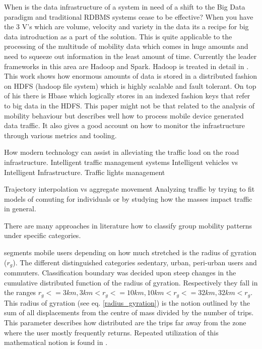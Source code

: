\documentclass[12pt, a4paper]{report}
\theoremstyle{definition}
\theoremstyle{definition}%
\theoremstyle{definition}%
\theoremstyle{definition}%
\theoremstyle{definition}%
\theoremstyle{definition}%
\begin{document}
When is the data infrastructure of a system in need of a shift to the Big Data paradigm and traditional RDBMS systems cease to be effective? When you have the 3 V's which are volume, velocity and variety in the data its a recipe for big data introduction as a part of the solution. This is quite applicable to the processing of the multitude of mobility data which comes in huge amounts and need to squeeze out information in the least amount of time. Currently the leader frameworks in this area are Hadoop and Spark. Hadoop is treated in detail in \cite{Liu2014}. This work shows how enormous amounts of data is stored in a distributed fashion on HDFS (hadoop file system) which is highly scalable and fault tolerant. On top of his there is Hbase which logically stores in an indexed fashion keys that refer to big data in the HDFS. This paper \cite{Liu2014} might not be that related to the analysis of mobility behaviour but describes well how to process mobile device generated data traffic. It also gives a good account on how to monitor the infrastructure through various metrics and tooling.   

How modern technology can assist in alleviating the traffic load on the road infrastructure.
Intelligent traffic management systems
Intelligent vehicles vs Intelligent Infrastructure. \cite{Nkoro2014}
Traffic lights management \cite{AlNuaimi2015} \cite{Marino2017}



Trajectory interpolation vs aggregate movement
Analyzing traffic by trying to fit models of comuting for individuals or by studying how the masses impact traffic in general.

There are many approaches in literature how to classify group mobility patterns under specific categories.

\cite{Hoteit2014} segments mobile users depending on how much stretched is the radius of gyration (\(r_{g}\)). The different distinguished categories sedentary, urban, peri-urban users and commuters. Classification boundary was decided upon steep changes in the cumulative distributed function of the radius of gyration. Respectively they fall in the ranges \(r_{g} <= 3km, 3km < r_{g} <= 10km, 10km < r_{g} <= 32km, 32km < r_{g}\). This radius of gyration (see eq. \ref{radius_gyration}) is the notion outlined by the sum of all displacements from the centre of mass divided by the number of trips. This parameter describes how distributed are the trips far away from the zone where the user mostly frequently returns. Repeated utilization of this mathematical notion is found in \cite{Hoteit2014,Gonzalez2008,Hoteit2016}.
\end{document}
